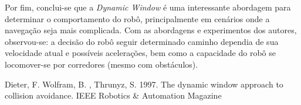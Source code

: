 \documentclass[12pt, a4paper]{article}
\begin{document}
	Por fim, conclui-se que a \textit{Dynamic Window} é uma interessante abordagem para determinar o comportamento do robô, principalmente em cenários onde a navegação seja mais complicada. Com as abordagens e experimentos dos autores, observou-se: a decisão do robô seguir determinado caminho dependia de sua velocidade atual e possíveis acelerações, bem como a capacidade do robô se locomover-se por corredores (mesmo com obstáculos).

	\begin{thebibliography}{2}

		 Dieter, F. Wolfram, B. , Thrunyz, S. 1997. The dynamic window approach to collision avoidance. IEEE Robotics \& Automation Magazine
		
		\end{thebibliography}
		
	
\end{document}
